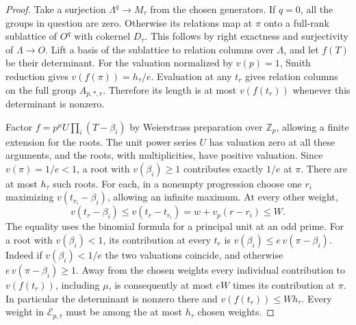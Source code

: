 \documentclass[a4paper,11pt]{article}
\theoremstyle{definition}
\theoremstyle{remark}
\newcommand{\ZZ}{\mathbb Z}\newcommand{\ord}{\operatorname{ord}}
\numberwithin{equation}{section}
\begin{document}
\begin{proof}
Take a surjection \(\Lambda^q\to M_\tau\) from the chosen
generators. If \(q=0\), all the groups in question are zero.
Otherwise its relations map at \(\pi\) onto a full-rank sublattice
of \(O^q\) with cokernel \(D_\tau\). This follows by right
exactness and surjectivity of \(\Lambda\to O\). Lift a basis of
the sublattice to relation columns over \(\Lambda\), and let
\(f(T)\) be their determinant. For the valuation normalized by
\(v(p)=1\), Smith reduction gives \(v(f(\pi))=h_\tau/e\).
Evaluation at any \(t_r\) gives relation columns on the full
group \(A_{p,*,r}\). Therefore its length is at most \(v(f(t_r))\)
whenever this determinant is nonzero.

Factor \(f=p^\mu U\prod_i(T-\beta_i)\) by Weierstrass
preparation over \(\ZZ_p\), allowing a finite extension for
the roots. The unit power series \(U\) has valuation zero at
all these arguments, and the roots, with multiplicities, have
positive valuation. Since \(v(\pi)=1/e<1\), a root with
\(v(\beta_i)\ge1\) contributes exactly \(1/e\) at \(\pi\).
There are at most \(h_\tau\) such roots. For each, in a nonempty
progression choose one \(r_i\) maximizing \(v(t_{r_i}-\beta_i)\),
allowing an infinite maximum. At every other weight,
\[
 v(t_r-\beta_i)\le v(t_r-t_{r_i})
       =w+v_p(r-r_i)\le W .
\]
The equality uses the binomial formula for a principal unit at
an odd prime. For a root with \(v(\beta_i)<1\), its contribution
at every \(t_r\) is \(v(\beta_i)\le e\,v(\pi-\beta_i)\).
Indeed if \(v(\beta_i)<1/e\) the two valuations coincide, and
otherwise \(e\,v(\pi-\beta_i)\ge1\).
Away from the chosen weights every individual contribution to
\(v(f(t_r))\), including \(\mu\), is consequently at most
\(eW\) times its contribution at \(\pi\). In particular the
determinant is nonzero there and \(v(f(t_r))\le W h_\tau\).
Every weight in \(\mathcal E_{p,\tau}\) must be among the at
most \(h_\tau\) chosen weights.
\end{proof}
\end{document}
